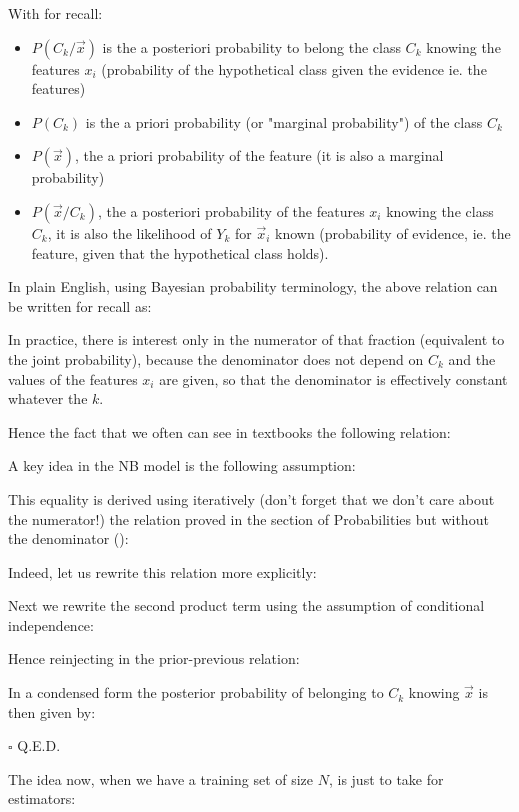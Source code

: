 	With for recall:
	\begin{itemize}
		\item $P(C_k/\vec{x})$ is the a posteriori probability to belong the class $C_k$ knowing the features $x_i$ (probability of the hypothetical class given the evidence ie. the features)
		\item $P(C_k)$ is the a priori probability (or "marginal probability") of the class $C_k$
		\item $P(\vec{x})$, the a priori probability of the feature (it is also a marginal probability)
		\item $P(\vec{x}/C_k)$, the a posteriori probability of the features $x_i$ knowing the class $C_k$, it is also the likelihood of $Y_k$ for $\vec{x}_i$ known (probability of evidence, ie. the feature, given that the hypothetical class holds).
	\end{itemize}
	In plain English, using Bayesian probability terminology, the above relation can be written for recall as:
	
	In practice, there is interest only in the numerator of that fraction (equivalent to the joint probability), because the denominator does not depend on $C_k$ and the values of the features $x_i$ are given, so that the denominator is effectively constant whatever the $k$.

	Hence the fact that we often can see in textbooks the following relation:	
	
	\begin{theorem}
	A key idea in the NB model is the following assumption:
	
	\end{theorem}
	\begin{dem}
	This equality is derived using iteratively (don't forget that we don't care about the numerator!) the relation proved in the section of Probabilities but without the denominator ():
	
	Indeed, let us rewrite this relation more explicitly:
	
	Next we rewrite the second product term using the assumption of conditional independence:
	
	Hence reinjecting in the prior-previous relation:
	
	In a condensed form the posterior probability of belonging to $C_k$ knowing $\vec{x}$ is then given by:
	
	\begin{flushright}
		$\square$  Q.E.D.
	\end{flushright}
	\end{dem}
	The idea now, when we have a training set of size $N$, is just to take for estimators:
	
